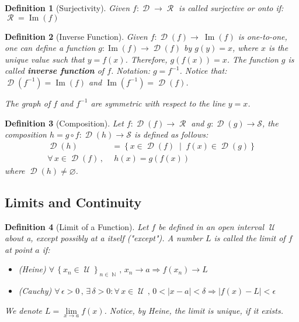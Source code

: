 \documentclass[12pt]{article}
\let\emptyset\varnothing
\let\RA\Rightarrow
\newcommand{\set}[2]{\left\{{#1}\;\middle|\;{#2}\right\}}
\newcommand{\Forall}[1]{\forall\,{#1}\,,\,}
\newcommand{\Exist}[1]{\exists\,{#1}:}
\newcommand{\seq}[2]{\left\{{#1}\right\}_{#2 \in\N}}
\DeclareMathOperator{\N}{\mathbb{N}}
\DeclareMathOperator{\D}{\mathcal{D}}
\DeclareMathOperator{\U}{\mathcal{U}}
\DeclareMathOperator{\Ran}{\mathcal{R}}
\DeclareMathOperator{\Image}{Im}
\newtheorem{definition}{Definition}[subsection]
\begin{document}
\begin{definition}[Surjectivity]
  Given $f:\D\to\Ran$ is called surjective or onto if: $\Ran=\Image(f)$
\end{definition}

\begin{definition}[Inverse Function]
  Given $f:\D(f)\to\ \Image(f)$ is one-to-one, one can define a function $g:\Image(f)\to\D(f)$ by $g(y)=x$, where $x$ is the unique value such that $y=f(x)$. Therefore, $g(f(x))=x$. The function $g$ is called \textbf{inverse function} of $f$. Notation: $g=f^{-1}$. Notice that: $\D(f^{-1})=\Image(f)$ and $\Image(f^{-1})=\D(f)$.

  The graph of $f$ and $f^{-1}$ are symmetric with respect to the line $y=x$.
\end{definition}

\begin{definition}[Composition]
  Let $f:\D(f)\to\Ran$ and $g:\D(g)\to\mathcal{S}$, the composition $h=g\circ f:\D(h)\to\mathcal{S}$ is defined as follows:
  \begin{align*}
    \D(h)&=\set{x\in\D(f)}{f(x)\in\D(g)}\\
    \Forall{x\in \D(f)}&\;h(x)=g(f(x))
  \end{align*}
  where $\D(h)\neq\emptyset$.
\end{definition}

\pagebreak

\subsection{Limits and Continuity}

\begin{definition}[Limit of a Function]
  Let $f$ be defined in an open interval $\U$ about a, except possibly at a itself ("except"). A number $L$ is called the limit of $f$ at point $a$ if:
  \begin{itemize}
    \item[](Heine) $\Forall{\seq{x_n\in\U}{n}} x_n\to a \RA f(x_n)\to L$
    \item[](Cauchy) $\Forall{\epsilon>0}\Exist{\delta>0}\Forall{x\in\U}0<|x-a|<\delta\RA |f(x)-L|<\epsilon$
  \end{itemize}
  We denote $L=\lim\limits_{x\to a}f(x)$. Notice, by Heine, the limit is unique, if it exists.
\end{definition}
\end{document}

